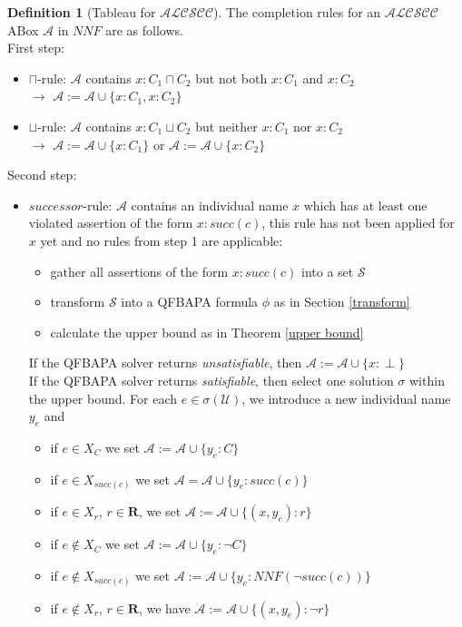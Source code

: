 \documentclass{book}
\theoremstyle{break}
\theoremstyle{definition}
\newtheorem{mydef}{Definition}
\begin{document}
\begin{mydef}[Tableau for $\mathcal{ALCSCC}$]
The completion rules for an $\mathcal{ALCSCC}$ ABox $\mathcal{A}$ in $NNF$ are as follows.\\
First step:
\begin{itemize}
\item\label{cap} $\sqcap$-rule: $\mathcal{A}$ contains $x:C_1\sqcap C_2$ but not both $x:C_1$ and $x:C_2$\\
$\rightarrow$ $\mathcal{A}:=\mathcal{A}\cup\{x:C_1, x:C_2\}$
\item\label{cup} $\sqcup$-rule: $\mathcal{A}$ contains $x:C_1\sqcup C_2$ but neither $x:C_1$ nor $x:C_2$\\
$\rightarrow$ $\mathcal{A}:=\mathcal{A}\cup\{x:C_1\}$ or $\mathcal{A}:=\mathcal{A}\cup\{x:C_2\}$
\end{itemize}
Second step:
\begin{itemize}
\item\label{succ} $successor$-rule: $\mathcal{A}$ contains an individual name $x$ which has at least one violated assertion of the form $x:succ(c)$, this rule has not been applied for $x$ yet and no rules from step 1 are applicable:
\begin{itemize}
\item gather all assertions of the form $x:succ(c)$ into a set $\mathcal{S}$
\item transform $\mathcal{S}$ into a QFBAPA formula $\phi$ as in Section \ref{transform}
\item calculate the upper bound as in Theorem \ref{upper bound}
\end{itemize}
If the QFBAPA solver returns \textit{unsatisfiable}, then $\mathcal{A}:=\mathcal{A}\cup\{x:\perp\}$\\
If the QFBAPA solver returns \textit{satisfiable}, then select one solution $\sigma$ within the upper bound. For each $e\in\sigma(\mathcal{U})$, we introduce a new individual name $y_e$ and
\begin{itemize}
\item if $e\in X_C$ we set $\mathcal{A}:=\mathcal{A}\cup\{y_e:C\}$
\item if $e\in X_{succ(c)}$ we set $\mathcal{A}=\mathcal{A}\cup\{y_e:succ(c)\}$
\item if $e\in X_r$, $r\in\mathbf{R}$, we set $\mathcal{A}:=\mathcal{A}\cup\{(x,y_e):r\}$
\item if $e\notin X_C$ we set $\mathcal{A}:=\mathcal{A}\cup\{y_e:\neg C\}$
\item if $e\notin X_{succ(c)}$ we set $\mathcal{A}:=\mathcal{A}\cup\{y_e: NNF(\neg succ(c))\}$
\item if $e\notin X_r$, $r\in\mathbf{R}$, we have $\mathcal{A}:=\mathcal{A}\cup\{(x,y_e):\neg r\}$
\end{itemize}
\end{itemize}
\end{mydef}
\end{document}
